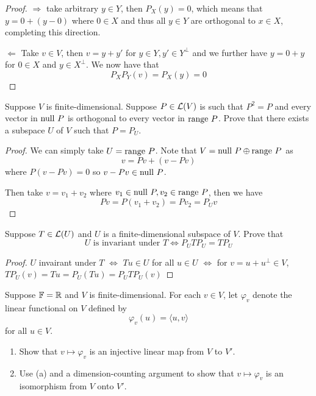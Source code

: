 \documentclass{extarticle}
\begin{document}
\begin{proof}
\(\Rightarrow\) take arbitrary \(y \in Y\), then \(P_X (y) = 0\), which means that \(y = 0 + (y - 0)\) where 
\(0 \in X\) and thus all \(y \in Y\) are orthogonal to \(x \in X\), completing this direction. 

\(\Leftarrow\) Take \(v \in V\), then \(v = y + y'\) for \(y \in Y, y' \in Y^\perp\) and we further have 
\(y = 0 + y\) for \(0 \in X\) and \(y \in X^\perp\). We now have that 
\[P_XP_Y(v) = P_X(y)  = 0\] 
\end{proof}

\begin{problem}{9}
    Suppose \(V\) is finite-dimensional. Suppose \(P \in \mathcal{L}(V)\) is such that \(P^2 = P\) and 
    every vector in \(\text{null } P\) is orthogonal to every vector in \(\text{range } P\). Prove that there 
    exists a subspace \(U\) of \(V\) such that \(P = P_{U}\).
\end{problem}

\begin{proof}
We can simply take \(U = \text{range } P\). Note that \(V = \text{null } P \oplus \text{range } P\) as 
\[v = Pv + (v - Pv)\]
where \(P(v - Pv) = 0\) so \(v - Pv \in \text{null } P\). 

Then take \(v = v_1 + v_2\) where \(v_1 \in \text{null } P, v_2 \in \text{range } P\), then we have 
\[Pv = P(v_1 + v_2) = Pv_2 = P_U v \] 
\end{proof}

\begin{problem}{11}
    Suppose \(T \in \mathcal{L}(U)\) and \(U\) is a finite-dimensional subspace of \(V\). Prove that 
    \[U \text{ is invariant under } T \Leftrightarrow P_U T P_U = T P_U\]
\end{problem}

\begin{proof}
\(U\) invairant under \(T\) \(\Leftrightarrow\) \(Tu \in U\) for all \(u \in U\) 
\(\Leftrightarrow\) for \(v = u + u^\perp \in V\), \(TP_U (v) = Tu = P_U(Tu) = P_U T P_U (v) \)
\end{proof}


\begin{problem}{13}
    Suppose \(\mathbb{F} = \mathbb{R}\) and \(V\) is finite-dimensional. For each \(v \in V\), let \(\varphi_v\) denote 
    the linear functional on \(V\) defined by 
    \[\varphi_v(u) = \langle u,v \rangle\]
    for all \(u \in V\).
    \begin{enumerate}[label=(\alph*)]
        \item Show that \(v \mapsto \varphi_v\) is an injective linear map from \(V\) to \(V'\). 
        \item Use (a) and a dimension-counting argument to show that \(v \mapsto \varphi_v\) is an 
        isomorphism from \(V\) onto \(V'\).
    \end{enumerate}
\end{problem}
\end{document}
